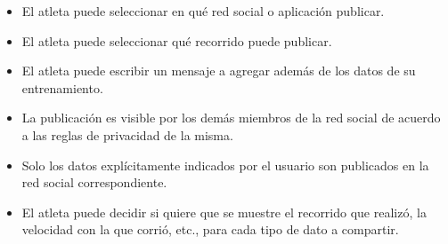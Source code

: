 \begin{enumerate}
\begin{itemize}
    \begin{itemize}
    \itemsep1pt\parskip0pt
    \item
      El atleta puede seleccionar en qué red social o aplicación
      publicar.
    \item
      El atleta puede seleccionar qué recorrido puede publicar.
    \item
      El atleta puede escribir un mensaje a agregar además de los datos
      de su entrenamiento.
    \item
      La publicación es visible por los demás miembros de la red social
      de acuerdo a las reglas de privacidad de la misma.
    \item
      Solo los datos explícitamente indicados por el usuario son
      publicados en la red social correspondiente.
    \item
      El atleta puede decidir si quiere que se muestre el recorrido que
      realizó, la velocidad con la que corrió, etc., para cada tipo de
      dato a compartir.
    \end{itemize}
  \end{itemize}
\end{enumerate}
